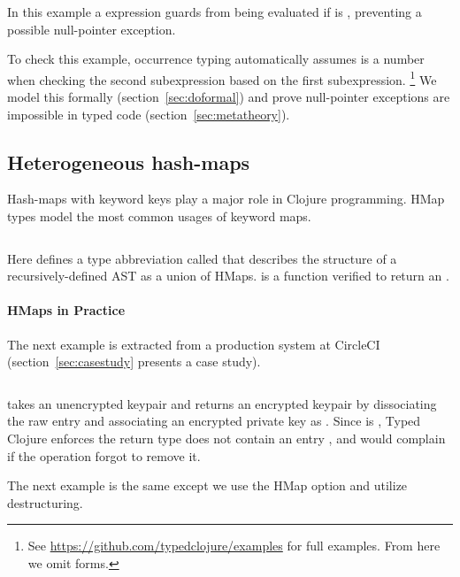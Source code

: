 In this example a  expression guards 
from being evaluated if  is , preventing
a possible null-pointer exception.

To check this example,
occurrence typing 
automatically
assumes
 is a number when checking the second  subexpression
based on the first subexpression.
\footnote{See \url{https://github.com/typedclojure/examples}
  for full examples. From here we omit  forms.}
We model this formally (section~\ref{sec:doformal}) and prove
null-pointer exceptions are impossible in typed code (section~\ref{sec:metatheory}).

\subsection{Heterogeneous hash-maps}

Hash-maps with keyword keys play a major role in Clojure programming.
HMap types model the most common usages of keyword maps.

\begin{exmp}
\inputminted[firstline=6,lastline=13]{clojure}{code/demo/src/demo/hmap.clj}
\label{example:decleaf}
\end{exmp}

Here  defines a type abbreviation called 
that describes the structure of a recursively-defined AST as a union of HMaps.
 is a function verified to return an .

\paragraph{HMaps in Practice} The next example is extracted from a production system at CircleCI
(section~\ref{sec:casestudy} presents a case study).

\begin{exmp}
\inputminted[firstline=10,lastline=22]{clojure}{code/demo/src/demo/key.clj}
\end{exmp}

 takes an unencrypted keypair and returns an encrypted keypair by
dissociating the raw  entry and associating an encrypted private key
as .
Since  is , Typed Clojure enforces the return type
does not contain an entry , and would complain if the 
operation forgot to remove it.

The next example is the same except we use the 
HMap option
and
utilize destructuring.

